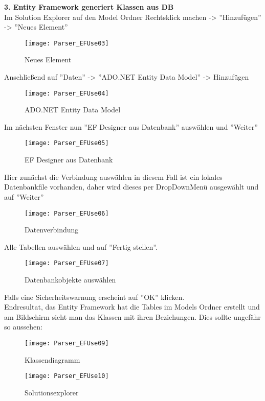 \textbf{3. Entity Framework generiert Klassen aus DB} \\
Im Solution Explorer auf den Model Ordner Rechtsklick machen -> ''Hinzufügen'' -> ''Neues Element''
\begin{figure}[H]
    \centering
    \texttt{[image: Parser\_EFUse03]}
    \caption{Neues Element}
    \label{fig:parsef03}
\end{figure} 
Anschließend auf ''Daten'' -> ''ADO.NET Entity Data Model'' -> Hinzufügen
\begin{figure}[H]
    \centering
    \texttt{[image: Parser\_EFUse04]}
    \caption{ADO.NET Entity Data Model}
    \label{fig:parsef04}
\end{figure} 
Im nächsten Fenster nun  ''EF Designer aus Datenbank'' auswählen und ''Weiter''
\begin{figure}[H]
    \centering
    \texttt{[image: Parser\_EFUse05]}
    \caption{EF Designer aus Datenbank}
    \label{fig:parsef05}
\end{figure} 
Hier zunächst die Verbindung auswählen in diesem Fall ist ein lokales Datenbankfile vorhanden, daher wird dieses per DropDownMenü ausgewählt und auf ''Weiter''
\begin{figure}[H]
    \centering
    \texttt{[image: Parser\_EFUse06]}
    \caption{Datenverbindung}
    \label{fig:parsef06}
\end{figure} 
Alle Tabellen auswählen und auf ''Fertig stellen''. 
\begin{figure}[H]
    \centering
    \texttt{[image: Parser\_EFUse07]}
    \caption{Datenbankobjekte auswählen}
    \label{fig:parsef07}
\end{figure} 
Falls eine Sicherheitswarnung erscheint auf ''OK'' klicken. \\
Endresultat, das Entity Framework hat die Tables im Models Ordner erstellt und am Bildschirm sieht man das Klassen mit ihren Beziehungen. Dies sollte ungefähr so aussehen:
\begin{figure}[H]
    \centering
    \texttt{[image: Parser\_EFUse09]}
    \caption{Klassendiagramm}
    \label{fig:parsef07}
\end{figure} 
\begin{figure}[H]
    \centering
    \texttt{[image: Parser\_EFUse10]}
    \caption{Solutionsexplorer}
    \label{fig:parsef07}
\end{figure} 



